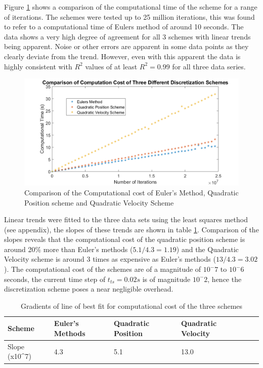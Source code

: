 Figure \ref{fig:SchemeTime} shows a comparison of the computational time of the scheme for a range of iterations. The schemes were tested up to 25 million iterations, this was found to refer to a computational time of Eulers method of around 10 seconds. The data shows a very high degree of agreement for all 3 schemes with linear trends being apparent. Noise or other errors are apparent in some data points as they clearly deviate from the trend. However, even with this apparent the data is highly consistent with $R^2$ values of at least $R^2=0.99$ for all three data series.

\begin{figure}[H]
\centering
\includegraphics[width=1.0\textwidth]{Figures/SchemeComputationTime.png}
\caption{\label{fig:SchemeTime} Comparison of the Computational cost of Euler's Method, Quadratic Position scheme and Quadratic Velocity Scheme}
\end{figure} 

Linear trends were fitted to the three data sets using the least squares method (see appendix), the slopes of these trends are shown in table \ref{tab:Slopes}. Comparison of the slopes reveals that the computational cost of the quadratic position scheme is around 20\% more than Euler's methods ($5.1/4.3=1.19$) and the Quadratic Velocity scheme is around 3 times as expensive as Euler's methods ($13/4.3=3.02$). The computational cost of 
 the schemes are of a magnitude of $10^-7$ to $10^-6$ seconds, the current time step of $t_{ts}=0.02s$ is of magnitude $10^-2$, hence the discretization scheme poses a near negligible overhead.
\begin{table}[H]
\centering
\label{tab:Slopes}
\begin{tabular}{llllll}
\multicolumn{1}{l|}{Scheme}                        & Euler's Methods & Quadratic Position & Quadratic Velocity\\ \hline
\multicolumn{1}{l|}{Slope (x10\textasciicircum 7)} & 4.3             & 5.1                & 13.0\\
\end{tabular}
\caption{Gradients of line of best fit for computational cost of the three schemes}
\end{table}

